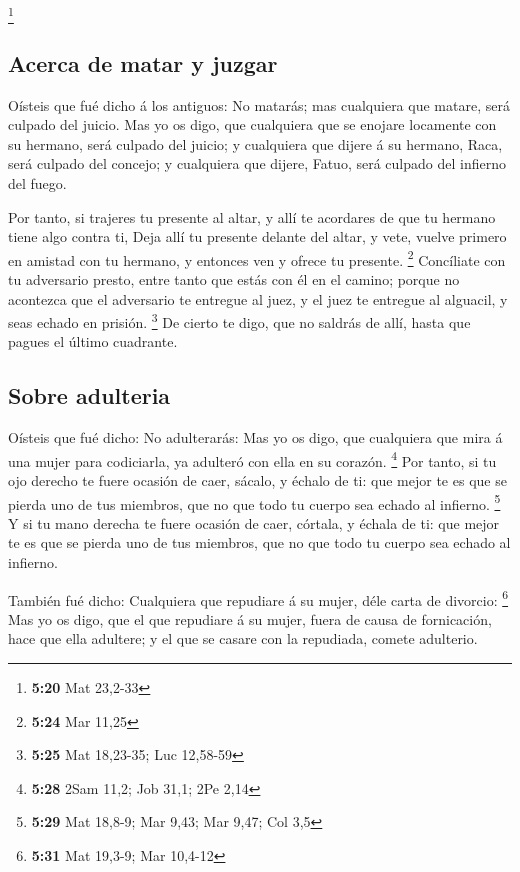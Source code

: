\footnote{\textbf{5:20} Mat 23,2-33}

\hypertarget{acerca-de-matar-y-juzgar}{%
\subsection{Acerca de matar y juzgar}\label{acerca-de-matar-y-juzgar}}

 Oísteis que fué dicho á los antiguos: No matarás; mas
cualquiera que matare, será culpado del juicio.  Mas yo os
digo, que cualquiera que se enojare locamente con su hermano, será
culpado del juicio; y cualquiera que dijere á su hermano, Raca, será
culpado del concejo; y cualquiera que dijere, Fatuo, será culpado del
infierno del fuego.

 Por tanto, si trajeres tu presente al altar, y allí te
acordares de que tu hermano tiene algo contra ti,  Deja
allí tu presente delante del altar, y vete, vuelve primero en amistad
con tu hermano, y entonces ven y ofrece tu presente. \footnote{\textbf{5:24}
  Mar 11,25}  Concíliate con tu adversario presto, entre
tanto que estás con él en el camino; porque no acontezca que el
adversario te entregue al juez, y el juez te entregue al alguacil, y
seas echado en prisión. \footnote{\textbf{5:25} Mat 18,23-35; Luc
  12,58-59}  De cierto te digo, que no saldrás de allí,
hasta que pagues el último cuadrante.

\hypertarget{sobre-adulteria}{%
\subsection{Sobre adulteria}\label{sobre-adulteria}}

 Oísteis que fué dicho: No adulterarás:  Mas
yo os digo, que cualquiera que mira á una mujer para codiciarla, ya
adulteró con ella en su corazón. \footnote{\textbf{5:28} 2Sam 11,2; Job
  31,1; 2Pe 2,14}  Por tanto, si tu ojo derecho te fuere
ocasión de caer, sácalo, y échalo de ti: que mejor te es que se pierda
uno de tus miembros, que no que todo tu cuerpo sea echado al infierno.
\footnote{\textbf{5:29} Mat 18,8-9; Mar 9,43; Mar 9,47; Col 3,5}
 Y si tu mano derecha te fuere ocasión de caer, córtala, y
échala de ti: que mejor te es que se pierda uno de tus miembros, que no
que todo tu cuerpo sea echado al infierno.

 También fué dicho: Cualquiera que repudiare á su mujer,
déle carta de divorcio: \footnote{\textbf{5:31} Mat 19,3-9; Mar 10,4-12}
 Mas yo os digo, que el que repudiare á su mujer, fuera de
causa de fornicación, hace que ella adultere; y el que se casare con la
repudiada, comete adulterio.

